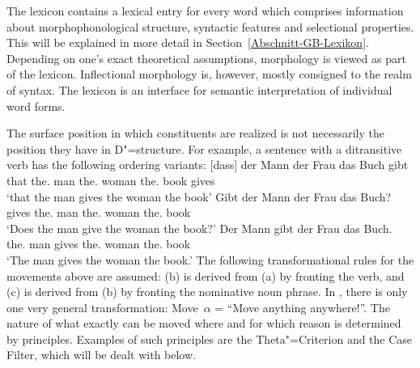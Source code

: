 The lexicon contains a lexical entry for every word which comprises information about morphophonological structure, syntactic features
and selectional properties. This will be explained in more detail in Section~\ref{Abschnitt-GB-Lexikon}. Depending on one's exact theoretical
assumptions, morphology is viewed as part of the lexicon. Inflectional morphology is, however, mostly consigned
to the realm of syntax. The lexicon is an interface for semantic interpretation of individual word forms.

The surface position in which constituents are realized is not necessarily the position they have in
D"=structure. For example, a sentence with a ditransitive verb has the following ordering variants:
\eal
\ex 
\gll {}[dass] der Mann der Frau das Buch gibt\\
	 {}\spacebr{}that the.\nom{} man the.\dat{} woman the.\acc{} book gives\\
\glt `that the man gives the woman the book'
\ex 
\gll Gibt der Mann der Frau das Buch?\\
	 gives the.\nom{} man the.\dat{} woman the.\acc{} book\\
\glt `Does the man give the woman the book?'
\ex 
\gll Der Mann gibt der Frau das Buch.\\
	 the.\nom{} man gives the.\dat{} woman the.\acc{} book\\
\glt `The man gives the woman the book.'
\zl
The following transformational rules for the movements above are assumed: (b) is derived from (a) by fronting the verb, 
and (c) is derived from (b) by fronting the nominative noun phrase. In \gbt, there is only one very general transformation:
Move~$\alpha$ = ``Move anything anywhere!''. The nature of what exactly can be moved where and for which reason is determined
by principles. Examples of such principles are the Theta"=Criterion and the Case Filter, which will be
dealt with below.

